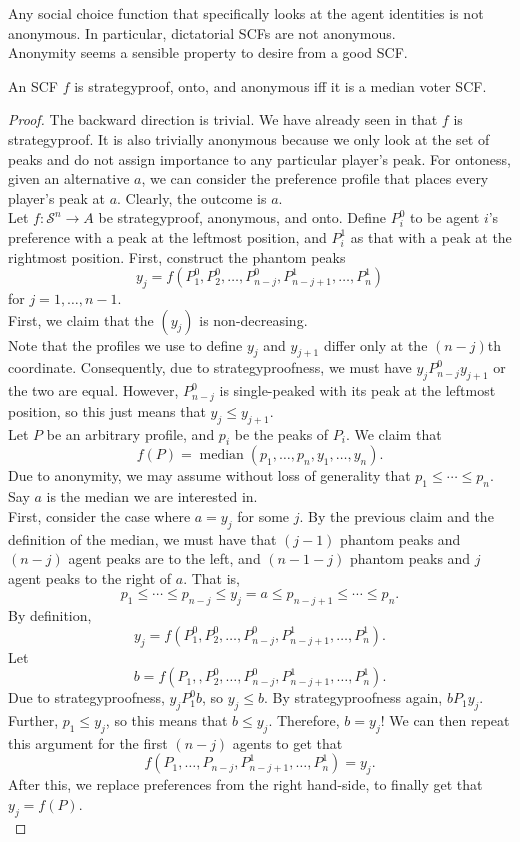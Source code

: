 		Any social choice function that specifically looks at the agent identities is not anonymous. In particular, dictatorial SCFs are not anonymous.\\
		Anonymity seems a sensible property to desire from a good SCF.

		\begin{ftheo}[Moulin 1980]
			An SCF $f$ is strategyproof, onto, and anonymous iff it is a median voter SCF.
		\end{ftheo}
		\begin{proof}
			The backward direction is trivial. We have already seen in  that $f$ is strategyproof. It is also trivially anonymous because we only look at the set of peaks and do not assign importance to any particular player's peak. For ontoness, given an alternative $a$, we can consider the preference profile that places every player's peak at $a$. Clearly, the outcome is $a$.\\

			Let $f : \mathcal{S}^n \to A$ be strategyproof, anonymous, and onto. Define $P_i^0$ to be agent $i$'s preference with a peak at the leftmost position, and $P_i^1$ as that with a peak at the rightmost position. First, construct the phantom peaks
			\[ y_j = f(P_1^0,P_2^0,\ldots,P_{n-j}^0,P_{n-j+1}^1,\ldots,P_n^1) \]
			for $j = 1,\ldots,n-1$.\\
			
			First, we claim that the $(y_j)$ is non-decreasing.\\
			Note that the profiles we use to define $y_j$ and $y_{j+1}$ differ only at the $(n-j)$th coordinate. Consequently, due to strategyproofness, we must have $y_j P_{n-j}^0 y_{j+1}$ or the two are equal. However, $P_{n-j}^0$ is single-peaked with its peak at the leftmost position, so this just means that $y_j \le y_{j+1}$.\\

			Let $P$ be an arbitrary profile, and $p_i$ be the peaks of $P_i$. We claim that
			\[ f(P) = \operatorname{median}(p_1,\ldots,p_n,y_1,\ldots,y_n). \]
			Due to anonymity, we may assume without loss of generality that $p_1 \le \cdots \le p_n$. Say $a$ is the median we are interested in.\\
			
			First, consider the case where $a = y_j$ for some $j$. By the previous claim and the definition of the median, we must have that $(j-1)$ phantom peaks and $(n-j)$ agent peaks are to the left, and $(n-1-j)$ phantom peaks and $j$ agent peaks to the right of $a$. That is,
			\[ p_1 \le \cdots \le p_{n-j} \le y_j = a \le p_{n-j+1} \le \cdots \le p_n. \]
			By definition,
			\[ y_j = f(P_1^0,P_2^0,\ldots,P_{n-j}^0,P_{n-j+1}^1,\ldots,P_n^1). \]
			Let
			\[ b = f(P_1,,P_2^0,\ldots,P_{n-j}^0,P_{n-j+1}^1,\ldots,P_n^1). \]
			Due to strategyproofness, $y_j P_1^0 b$, so $y_j \le b$. By strategyproofness again, $b P_1 y_j$. Further, $p_1 \le y_j$, so this means that $b \le y_j$. Therefore, $b = y_j$! We can then repeat this argument for the first $(n-j)$ agents to get that
			\[ f(P_1,\ldots,P_{n-j},P_{n-j+1}^1,\ldots,P_n^1) = y_j. \]
			After this, we replace preferences from the right hand-side, to finally get that $y_j = f(P)$.\\


\end{proof}
